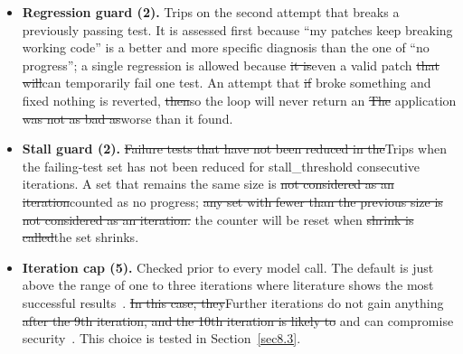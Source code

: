 \documentclass[pdflatex,sn-mathphys-num]{sn-jnl}%
\newcommand{\fix}[1]{{\color{fixcol}#1}}
\newcommand{\fixdel}[1]{{\color{fixcol}\sout{#1}}}
\newcommand{\rw}[2]{{\color{rwcol}#1}}%
\theoremstyle{thmstyleone}%
\theoremstyle{thmstyletwo}%
\theoremstyle{thmstylethree}%
\begin{document}
\begin{itemize}
\item \rw{\textbf{Regression guard (2).} Trips on the second attempt that breaks a previously passing test. It is assessed first because ``my patches keep breaking working code'' is a better and more specific diagnosis than the one of ``no progress''; a single regression is allowed because \fixdel{it is}\fix{even} a valid patch \fixdel{that will}\fix{can} temporarily fail one test. An attempt that \fixdel{if} broke something and fixed nothing is reverted, \fixdel{then}\fix{so} the loop will never return an \fixdel{The} application \fixdel{was not as bad as}\fix{worse than} it found.}{\textbf{Regression guard (2).} Trips on the second attempt that breaks a previously passing test. It is evaluated first because ``my patches keep breaking working code'' is a more precise and more actionable diagnosis than ``no progress''; a single regression is tolerated because a legitimate patch can briefly break one test. An attempt that broke something and fixed nothing is reverted, so the loop never hands back an application worse than it found.}
\item \rw{\textbf{Stall guard (2).} \fixdel{Failure tests that have not been reduced in the}\fix{Trips when the} failing-test set\fix{ has not been reduced for stall\_threshold consecutive iterations}. A set that remains the same size is \fixdel{not considered as an iteration}\fix{counted as no progress}; \fixdel{any set with fewer than the previous size is not considered as an iteration.} the counter will be reset when \fixdel{shrink is called}\fix{the set shrinks}.}{\textbf{Stall guard (2).} Trips when the failing-test set has not shrunk for stall\_threshold consecutive iterations; a set that stays the same size counts as no progress, and any shrink resets the counter.}
\item \rw{\textbf{Iteration cap (5).} Checked prior to every model call. The default is just above the range of one to three iterations where literature shows the most successful results\fix{~\cite{r09kiecker,r10arimbur}}. \fixdel{In this case, they}\fix{Further iterations} do not gain anything\fixdel{ after the 9th iteration, and the 10th iteration is likely to}\fix{ and can} compromise security\fix{~\cite{r05shukla}}. This choice is tested in Section~\ref{sec8.3}.}{\textbf{Iteration cap (5).} Checked before each model call. The default sits just above the one-to-three-iteration range in which the literature finds most of the achievable gain \cite{r09kiecker,r10arimbur}, because further iterations are unproductive and can degrade security \cite{r05shukla}; Section~\ref{sec8.3} tests this choice.}

\end{itemize}
\end{document}
